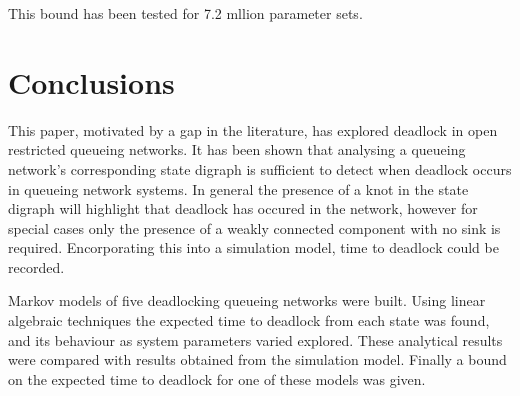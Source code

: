 \documentclass{article}
\begin{document}
This bound has been tested for 7.2 mllion parameter sets.









\section{Conclusions}

This paper, motivated by a gap in the literature, has explored deadlock in open restricted queueing networks.
It has been shown that analysing a queueing network's corresponding state digraph is sufficient to detect when deadlock occurs in queueing network systems.
In general the presence of a knot in the state digraph will highlight that deadlock has occured in the network, however for special cases only the presence of a weakly connected component with no sink is required.
Encorporating this into a simulation model, time to deadlock could be recorded.

Markov models of five deadlocking queueing networks were built.
Using linear algebraic techniques the expected time to deadlock from each state was found, and its behaviour as system parameters varied explored.
These analytical results were compared with results obtained from the simulation model.
Finally a bound on the expected time to deadlock for one of these models was given.





\end{document}
